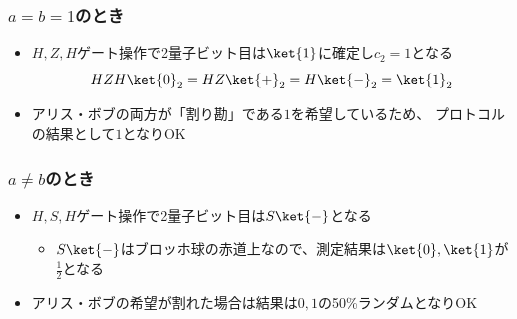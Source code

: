 \begin{frame}
  \frametitle{ $a = b = 1$のとき}

  \begin{figure}
  \end{figure}

  \begin{itemize}
    \item<+-> $H,Z,H$ゲート操作で2量子ビット目は$\ket{1}$に確定し$c_2 = 1$となる
    \[
      HZH\ket{0}_2 = HZ\ket{+}_2 = H\ket{-}_2 = \ket{1}_2
    \]

    \item<+-> アリス・ボブの両方が「割り勘」である$1$を希望しているため、
    プロトコルの結果として$1$となりOK
  \end{itemize}
\end{frame}

\begin{frame}
  \frametitle{ $a \ne b$のとき}

  \begin{figure}
  \end{figure}

  \begin{itemize}
    \item<+-> $H,S,H$ゲート操作で2量子ビット目は$S\ket{-}$となる
    \begin{itemize}
      \item $S\ket{-}$はブロッホ球の赤道上なので、測定結果は$\ket{0}, \ket{1}$が$\frac{1}{2}$となる
    \end{itemize}

    \item<+-> アリス・ボブの希望が割れた場合は結果は$0, 1$の50\%ランダムとなりOK
  \end{itemize}
\end{frame}

